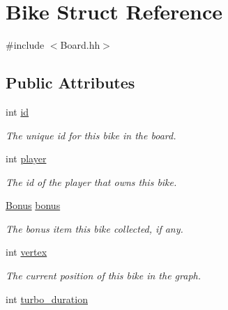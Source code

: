 \hypertarget{structBike}{}\section{Bike Struct Reference}
\label{structBike}


{\ttfamily \#include $<$Board.\+hh$>$}

\subsection*{Public Attributes}
\begin{DoxyCompactItemize}
\item 
int \hyperlink{structBike_a4c4b6d221d579e984765fb798d9e96e4}{id}\hypertarget{structBike_a4c4b6d221d579e984765fb798d9e96e4}{}\label{structBike_a4c4b6d221d579e984765fb798d9e96e4}

\begin{DoxyCompactList}\small\item\em The unique id for this bike in the board. \end{DoxyCompactList}\item 
int \hyperlink{structBike_ab80f76974d3cfac8f185c718f11edbe2}{player}\hypertarget{structBike_ab80f76974d3cfac8f185c718f11edbe2}{}\label{structBike_ab80f76974d3cfac8f185c718f11edbe2}

\begin{DoxyCompactList}\small\item\em The id of the player that owns this bike. \end{DoxyCompactList}\item 
\hyperlink{Board_8hh_a89fd84d2116e79c08d57dffb6d167ec2}{Bonus} \hyperlink{structBike_ae1a5416c14302be270d81e9c200473f0}{bonus}\hypertarget{structBike_ae1a5416c14302be270d81e9c200473f0}{}\label{structBike_ae1a5416c14302be270d81e9c200473f0}

\begin{DoxyCompactList}\small\item\em The bonus item this bike collected, if any. \end{DoxyCompactList}\item 
int \hyperlink{structBike_a80e6e21f2dc323f7ae031bd8e83924bc}{vertex}\hypertarget{structBike_a80e6e21f2dc323f7ae031bd8e83924bc}{}\label{structBike_a80e6e21f2dc323f7ae031bd8e83924bc}

\begin{DoxyCompactList}\small\item\em The current position of this bike in the graph. \end{DoxyCompactList}\item 
int \hyperlink{structBike_a3ee639beee1bcf2e6f847dbe6b9d88a6}{turbo\+\_\+duration}\hypertarget{structBike_a3ee639beee1bcf2e6f847dbe6b9d88a6}{}\label{structBike_a3ee639beee1bcf2e6f847dbe6b9d88a6}


\end{DoxyCompactItemize}
